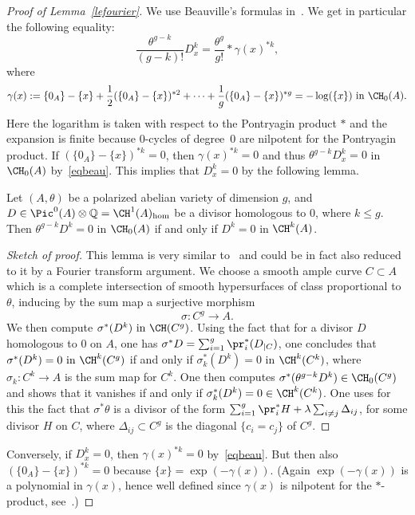 \begin{proof}[Proof of Lemma~\ref{lefourier}]
We use Beauville's formulas in~\cite[Proposition~6]{beauvillefourier}. We get in particular the following equality:
\begin{equation}\label{eqbeau}
\frac{\theta^{g-k}}{(g-k)!}D_x^k=\frac{\theta^g}{g!}*\gamma(x)^{*k},
\end{equation}
where
\[
\gamma(x):=\{0_A\}-\{x\}+\frac{1}{2}(\{0_A\}-\{x\})^{*2}+\dots+\frac{1}{g}(\{0_A\}-\{x\})^{*g}=-\log(\{x\}) \text{ in }\CH_0(A).
\]
Here the logarithm is taken with respect to the Pontryagin product $*$ and the expansion is finite because $0$-cycles of degree~$0$ are nilpotent for the Pontryagin product. If $(\{0_A\}-\{x\})^{*k}=0$, then $\gamma(x)^{*k}=0$ and thus ${\theta^{g-k}}D_x^k=0$ in $\CH_0(A)$ by~\eqref{eqbeau}. This implies that $D_x^k=0$ by the following lemma.

\begin{lemm}\label{lesurintA}
Let $(A,\theta)$ be a polarized abelian variety of dimension $g$, and $D\in \Pic^0(A)\otimes\mathbb{Q}=\CH^1(A)_{\hom}$ be a divisor homologous to $0$, where $k\leq g$. Then $\theta^{g-k}D^k=0$ in $\CH_0(A)$ if and only if $D^k=0$ in $\CH^k(A)$.
\end{lemm}

\begin{proof}[Sketch of proof]
This lemma is very similar to~\cite[Proposition~4.6]{bloch} and could be in fact also reduced to it by a Fourier transform argument. We choose a smooth ample curve $C\subset A$ which is a complete intersection of smooth hypersurfaces of class proportional to $\theta$, inducing by the sum map a surjective morphism
\[
\sigma: C^g\rightarrow A.
\]
We then compute $\sigma^*(D^k) \text{ in }\CH(C^g)$. Using the fact that for a divisor $D$ homologous to $0$ on $A$, one has $\sigma^*D=\sum_{i=1}^g\pr_i^*(D_{\mid C})$, one concludes that $\sigma^*(D^k)=0 \text{ in }\CH^k(C^g)$ if and only if $\sigma_k^*(D^k)=0$ in $\CH^k(C^k)$, where $\sigma_k:C^k\rightarrow A$ is the sum map for $C^k$. One then computes $\sigma^*(\theta^{g-k}D^k)\in\CH_0(C^g)$ and shows that it vanishes if and only if $\sigma_k^*(D^k)=0\in \CH^k(C^k)$. One uses for this the fact that $\sigma^*\theta$ is a divisor of the form $\sum_{i=1}^{g}\pr_i^*H+\lambda\sum_{i\not=j}\Delta_{ij}$, for some divisor $H$ on $C$, where $\Delta_{ij}\subset C^g$ is the diagonal $\{c_i=c_j\}$ of $C^g$.
\end{proof}

Conversely, if $D_x^k=0$, then $\gamma(x)^{*k}=0$ by~\eqref{eqbeau}. But then also $(\{0_A\}-\{x\})^{*k}=0$ because $\{x\}=\exp(-\gamma(x))$. (Again $\exp(-\gamma(x))$ is a polynomial in $\gamma(x)$, hence well defined since $\gamma(x)$ is nilpotent for the $*$-product, see~\cite{bloch}.)
\end{proof}

